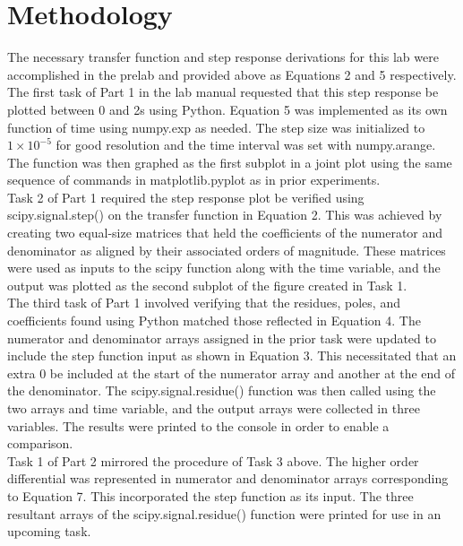 \documentclass[12pt]{report}
\begin{document}
\section{Methodology}

The necessary transfer function and step response derivations for this lab were accomplished in the prelab and provided above as Equations 2 and 5 respectively. The first task of Part 1 in the lab manual requested that this step response be plotted between 0 and 2s using Python. Equation 5 was implemented as its own function of time using numpy.exp as needed. The step size was initialized to $ 1\times 10^{-5} $ for good resolution and the time interval was set with numpy.arange. The function was then graphed as the first subplot in a joint plot using the same sequence of commands in matplotlib.pyplot as in prior experiments. \\

Task 2 of Part 1 required the step response plot be verified using scipy.signal.step() on the transfer function in Equation 2. This was achieved by creating two equal-size matrices that held the coefficients of the numerator and denominator as aligned by their associated orders of magnitude. These matrices were used as inputs to the scipy function along with the time variable, and the output was plotted as the second subplot of the figure created in Task 1. \\

The third task of Part 1 involved verifying that the residues, poles, and coefficients found using Python matched those reflected in Equation 4. The numerator and denominator arrays assigned in the prior task were updated to include the step function input as shown in Equation 3. This necessitated that an extra 0 be included at the start of the numerator array and another at the end of the denominator. The scipy.signal.residue() function was then called using the two arrays and time variable, and the output arrays were collected in three variables. The results were printed to the console in order to enable a comparison. \\

Task 1 of Part 2 mirrored the procedure of Task 3 above. The higher order differential was represented in numerator and denominator arrays corresponding to Equation 7. This incorporated the step function as its input. The three resultant arrays of the scipy.signal.residue() function were printed for use in an upcoming task. \\
\end{document}
